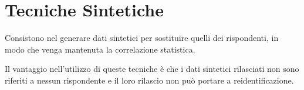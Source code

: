 \documentclass{report}
\begin{document}
\newpage
\section{Tecniche Sintetiche}
Consistono nel generare dati sintetici per sostituire quelli dei rispondenti, 
in modo che venga mantenuta la correlazione statistica.

Il vantaggio nell'utilizzo di queste tecniche è che i dati sintetici
rilasciati non sono riferiti a nessun rispondente e il loro rilascio 
non può portare a reidentificazione.
\end{document}
